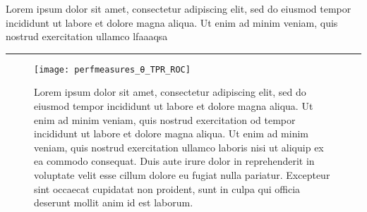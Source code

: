 Lorem ipsum dolor sit amet, consectetur adipiscing elit, sed do eiusmod tempor incididunt ut labore et dolore magna aliqua. Ut enim ad minim veniam, quis nostrud exercitation ullamco lfaaaqsa

\rule[0.5ex]{4.5in}{0.55pt}

\begin{figure}
    \texttt{[image: perfmeasures\_θ\_TPR\_ROC]}
    \caption{ Lorem ipsum dolor sit amet, consectetur adipiscing elit, sed do eiusmod tempor incididunt ut labore et dolore magna aliqua. Ut enim ad minim veniam, quis nostrud exercitation od tempor incididunt ut labore et dolore magna aliqua. Ut enim ad minim veniam, quis nostrud exercitation ullamco laboris nisi ut aliquip ex ea commodo consequat. Duis aute irure dolor in reprehenderit in voluptate velit esse cillum dolore eu fugiat nulla pariatur. Excepteur sint occaecat cupidatat non proident, sunt in culpa qui officia deserunt mollit anim id est laborum. }
\end{figure}
